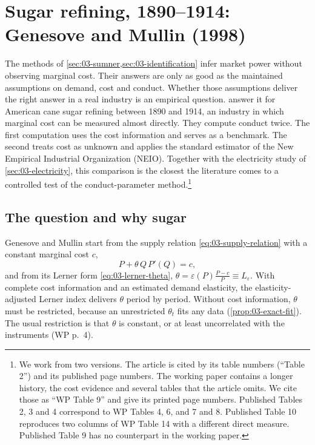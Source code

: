 \section{Sugar refining, 1890--1914: Genesove and Mullin (1998)}\label{sec:03-sugar}

The methods of \cref{sec:03-sumner,sec:03-identification} infer market power without observing marginal
cost. Their answers are only as good as the maintained assumptions on demand, cost and conduct. Whether
those assumptions deliver the right answer in a real industry is an empirical question.
\citet{GenesoveMullin1998} answer it for American cane sugar refining between 1890 and 1914, an industry in
which marginal cost can be measured almost directly. They compute conduct twice. The first computation uses
the cost information and serves as a benchmark. The second treats cost as unknown and applies the standard
estimator of the New Empirical Industrial Organization (NEIO). Together with the electricity study of
\cref{sec:03-electricity}, this comparison is the closest the literature comes to a controlled test of the
conduct-parameter method.\footnote{We work from two versions. The article \citep{GenesoveMullin1998} is
cited by its table numbers (``Table 2'') and its published page numbers. The working paper \citep{GenesoveMullin1995} contains a longer
history, the cost evidence and several tables that the article omits. We cite those as ``WP Table 9'' and
give its printed page numbers. Published Tables 2, 3 and 4 correspond to WP Tables 4, 6, and 7 and 8.
Published Table 10 reproduces two columns of WP Table 14 with a different direct measure. Published Table 9
has no counterpart in the working paper.}

\subsection{The question and why sugar}\label{sec:03-sugar-question}

Genesove and Mullin start from the supply relation \eqref{eq:03-supply-relation} with a constant marginal
cost $c$,
\begin{equation}\label{eq:03-gm-supply}
P + \theta\, Q\, P'(Q) = c ,
\end{equation}
and from its Lerner form \eqref{eq:03-lerner-theta}, $\theta = \varepsilon(P)\frac{P - c}{P} \equiv
L_\varepsilon$. With complete cost information and an estimated demand elasticity, the elasticity-adjusted
Lerner index delivers $\theta$ period by period. Without cost information, $\theta$ must be restricted,
because an unrestricted $\theta_t$ fits any data (\cref{prop:03-exact-fit}). The usual restriction is that
$\theta$ is constant, or at least uncorrelated with the instruments (WP p.~4).


